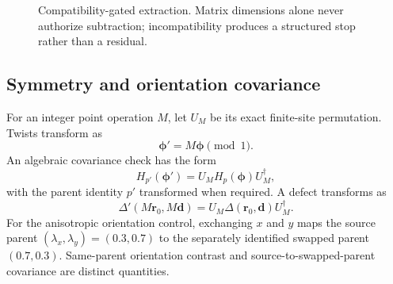 \documentclass[11pt]{article}
\begin{document}
\begin{figure}[htbp]
  \centering
  \caption{Compatibility-gated extraction.  Matrix dimensions alone never authorize
  subtraction; incompatibility produces a structured stop rather than a residual.}
  \label{fig:alignment-extraction-schematic}
\end{figure}

\subsection{Symmetry and orientation covariance}

For an integer point operation $M$, let $U_M$ be its exact finite-site permutation.
Twists transform as
\begin{equation}
  \boldsymbol\phi' = M\boldsymbol\phi\pmod1.
\end{equation}
An algebraic covariance check has the form
\begin{equation}
  H_{p'}(\boldsymbol\phi')
  =U_M H_p(\boldsymbol\phi)U_M^{\dagger},
  \label{eq:parent-covariance}
\end{equation}
with the parent identity $p'$ transformed when required.  A defect transforms as
\begin{equation}
  \Delta'(M\mathbf r_0,M\mathbf d)
  =U_M\Delta(\mathbf r_0,\mathbf d)U_M^{\dagger}.
  \label{eq:defect-covariance}
\end{equation}
For the anisotropic orientation control, exchanging $x$ and $y$ maps the source parent
$(\lambda_x,\lambda_y)=(0.3,0.7)$ to the separately identified swapped parent
$(0.7,0.3)$.  Same-parent orientation contrast and source-to-swapped-parent covariance
are distinct quantities.
\end{document}
